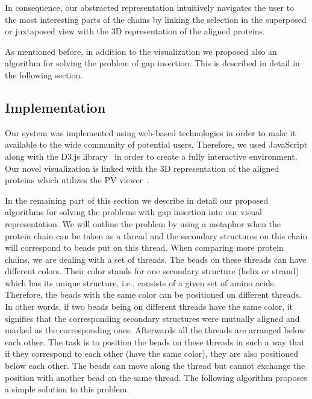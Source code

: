 \documentclass[twocolumn]{bmcart}%
\begin{document}
In consequence, our abstracted representation intuitively navigates the user to the most interesting parts of the chains by linking the selection in the superposed or juxtaposed view with the 3D representation of the aligned proteins. 

As mentioned before, in addition to the visualization we proposed also an algorithm for solving the problem of gap insertion.
This is described in detail in the following section.


\subsection*{Implementation}
Our system was implemented using web-based technologies in order to make it available to the wide community of potential users.
Therefore, we used JavaScript along with the D3.js library~\cite{d3} in order to create a fully interactive environment.
Our novel visualization is linked with the 3D representation of the aligned proteins which utilizes the PV viewer~\cite{biasini2014}. 

In the remaining part of this section we describe in detail our proposed algorithms for solving the problems with gap insertion into our visual representation.
We will outline the problem by using a metaphor when the protein chain can be taken as a thread and the secondary structures on this chain will correspond to beads put on this thread.
When comparing more protein chains, we are dealing with a set of threads. 
The beads on these threads can have different colors. 
Their color stands for one secondary structure (helix or strand) which has its unique structure, i.e., consists of a given set of amino acids.
Therefore, the beads with the same color can be positioned on different threads.
In other words, if two beads being on different threads have the same color, it signifies that the corresponding secondary structures were mutually aligned and marked as the corresponding ones. 
Afterwards all the threads are arranged below each other.
The task is to position the beads on these threads in such a way that if they correspond to each other (have the same color), they are also positioned below each other. 
The beads can move along the thread but cannot exchange the position with another bead on the same thread.
The following algorithm proposes a simple solution to this problem.

\end{document}
